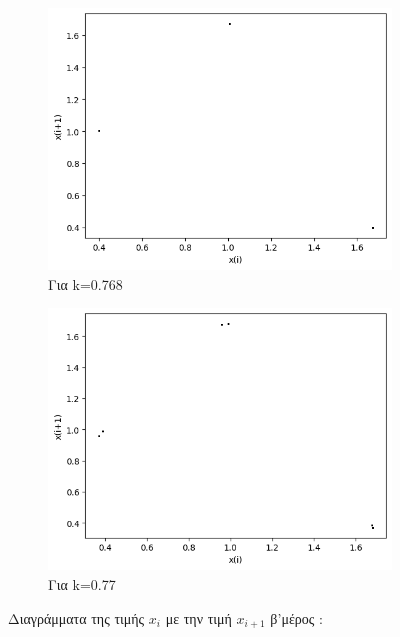 \begin{figure}[h!]
\begin{subfigure}[b]{0.4\textwidth}
		\includegraphics[width=\textwidth]{LateX images/graphs q14/g23}
		\caption{Για k=0.768}
		\label{f:k83}
	\end{subfigure}
	\hfill
	\begin{subfigure}[b]{0.4\textwidth}
		\centering
		\includegraphics[width=\textwidth]{LateX images/graphs q14/g24}
		\caption{Για k=0.77}
		\label{f:k80}
	\end{subfigure}
	\hfill
	\caption{Διαγράμματα της τιμής \(x_i\) με την τιμή \(x_{i+1}\) β'μέρος :}
\end{figure}
